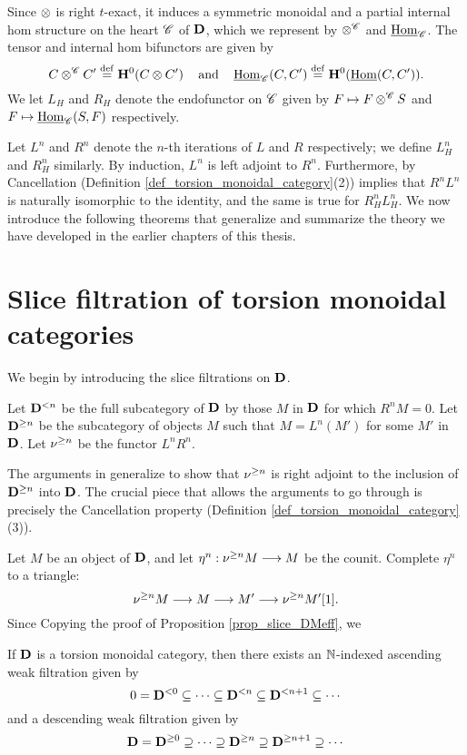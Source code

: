Since $\otimes$ is right $t$-exact, it induces a symmetric 
monoidal and a partial internal hom structure on the heart 
$\mathscr{C}$ of $\mathbf{D}$, which we represent by $\otimes^{\mathscr{C}}$ 
and $\underline{\mathrm{Hom}}_{\mathscr{C}}$. The tensor and internal hom bifunctors
are given by
\[
C \otimes^{\mathscr{C}} C' \stackrel{\mathrm{def}}{=} \mathbf{H}^0(C \otimes C') 
   \;\;\;\textrm{ and }\;\;\;
\underline{\mathrm{Hom}}_{\mathscr{C}}(C, C') \stackrel{\mathrm{def}}{=} \mathbf{H}^0(\underline{\mathrm{Hom}}(C, C')).
\]
We let $L_H$ and $R_H$ denote the endofunctor on 
$\mathscr{C}$ given by $F \mapsto F \otimes^{\mathscr{C}} S$ and $F \mapsto
\underline{\mathrm{Hom}}_{\mathscr{C}}(S, F)$ respectively.

Let $L^n$ and $R^n$ denote the $n$-th iterations of $L$ and $R$ 
respectively; we define $L_H^n$ and $R_H^n$ similarly. By induction,
$L^n$ is left adjoint to $R^n$. Furthermore, by Cancellation 
(Definition \ref{def_torsion_monoidal_category}(2)) implies that 
$R^nL^n$ is naturally isomorphic to the identity, and the same is 
true for $R_H^nL_H^n$. We now introduce the following theorems 
that generalize and summarize the theory we have developed in the
earlier chapters of this thesis.

\section{Slice filtration of torsion monoidal categories}
\label{sect_summary_slice_filt_on_DCat}

We begin by introducing the slice filtrations on $\mathbf{D}$. 

\begin{defn}
Let $\mathbf{D}^{< n}$ be the full subcategory of $\mathbf{D}$ by those 
$M$ in $\mathbf{D}$ for which $R^n M = 0$. Let $\mathbf{D}^{\geq n}$ be 
the subcategory of objects $M$ such that $M = L^n(M')$ for some 
$M'$ in $\mathbf{D}$. Let $\nu^{\geq n}$ be the functor  $L^nR^n$.
\end{defn}

The arguments in \cite[1.1]{HuKa} generalize to show that 
$\nu^{\geq n}$ is right adjoint to the inclusion of 
$\mathbf{D}^{\geq n}$ into $\mathbf{D}$. The crucial piece that
allows the arguments to go through is precisely the Cancellation
property (Definition \ref{def_torsion_monoidal_category} (3)).

Let $M$ be an object of $\mathbf{D}$, and let $\eta^n : \nu^{\geq n} M 
\longrightarrow M$ be the counit. Complete $\eta^n$ to a triangle:
\[
\nu^{\geq n} M \longrightarrow M \longrightarrow M' \longrightarrow \nu^{\geq n} M'[1].
\]
Since 
Copying the proof of Proposition \ref{prop_slice_DMeff}, we 

\begin{thm}\label{thm_summary_triang_cat}
If $\mathbf{D}$ is a torsion monoidal category, then there exists
an $\mathbb{N}$-indexed ascending weak filtration given by
\[
0 = \mathbf{D}^{< 0} \subseteq \cdots \subseteq \mathbf{D}^{< n}
   \subseteq \mathbf{D}^{< n + 1} \subseteq \cdots
\]
and a descending weak filtration given by
\[
\mathbf{D} = \mathbf{D}^{\geq 0} \supseteq \cdots \supseteq \mathbf{D}^{\geq n}
\supseteq \mathbf{D}^{\geq n + 1} \supseteq \cdots
\]
\end{thm}

